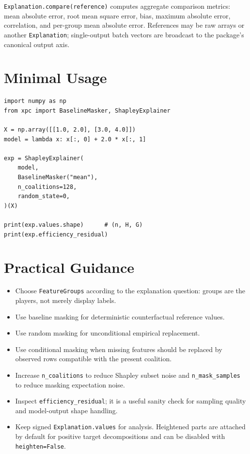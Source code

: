 \documentclass[11pt]{article}
\newcommand{\code}[1]{\texttt{#1}}
\begin{document}
\code{Explanation.compare(reference)} computes aggregate comparison metrics:
mean absolute error, root mean square error, bias, maximum absolute error,
correlation, and per-group mean absolute error.  References may be raw arrays
or another \code{Explanation}; single-output batch vectors are broadcast to the
package's canonical output axis.

\section{Minimal Usage}

\begin{verbatim}
import numpy as np
from xpc import BaselineMasker, ShapleyExplainer

X = np.array([[1.0, 2.0], [3.0, 4.0]])
model = lambda x: x[:, 0] + 2.0 * x[:, 1]

exp = ShapleyExplainer(
    model,
    BaselineMasker("mean"),
    n_coalitions=128,
    random_state=0,
)(X)

print(exp.values.shape)      # (n, H, G)
print(exp.efficiency_residual)
\end{verbatim}

\section{Practical Guidance}

\begin{itemize}
  \item Choose \code{FeatureGroups} according to the explanation question:
        groups are the players, not merely display labels.
  \item Use baseline masking for deterministic counterfactual reference values.
  \item Use random masking for unconditional empirical replacement.
  \item Use conditional masking when missing features should be replaced by
        observed rows compatible with the present coalition.
  \item Increase \code{n\_coalitions} to reduce Shapley subset noise and
        \code{n\_mask\_samples} to reduce masking expectation noise.
  \item Inspect \code{efficiency\_residual}; it is a useful sanity check for
        sampling quality and model-output shape handling.
  \item Keep signed \code{Explanation.values} for analysis.  Heightened parts
        are attached by default for positive target decompositions and can be
        disabled with \code{heighten=False}.
\end{itemize}
\end{document}
